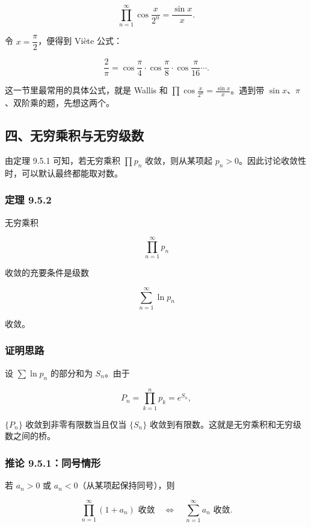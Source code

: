 \[
      \prod_{n=1}^{\infty}\cos\frac{x}{2^n}=\frac{\sin x}{x}.
    \]

令 \(x=\dfrac{\pi}{2}\)，便得到 Viète 公式：

\[
      \frac{2}{\pi}
      =
      \cos\frac{\pi}{4}\cdot\cos\frac{\pi}{8}\cdot\cos\frac{\pi}{16}\cdots.
    \]

\begin{notebox}
这一节里最常用的具体公式，就是 Wallis 和 \(\prod \cos \frac{x}{2^n}=\frac{\sin x}{x}\)。遇到带 \(\sin x\)、\(\pi\)、双阶乘的题，先想这两个。
\end{notebox}

\subsection*{四、无穷乘积与无穷级数}

由定理 9.5.1 可知，若无穷乘积 \(\prod p_n\) 收敛，则从某项起 \(p_n>0\)。因此讨论收敛性时，可以默认最终都能取对数。

\subsubsection*{定理 9.5.2}

无穷乘积

\[
      \prod_{n=1}^{\infty}p_n
    \]

收敛的充要条件是级数

\[
      \sum_{n=1}^{\infty}\ln p_n
    \]

收敛。

\subsubsection*{证明思路}

设 \(\sum\ln p_n\) 的部分和为 \(S_n\)。由于

\[
      P_n=\prod_{k=1}^{n}p_k=e^{S_n},
    \]

\(\{P_n\}\) 收敛到非零有限数当且仅当 \(\{S_n\}\) 收敛到有限数。这就是无穷乘积和无穷级数之间的桥。

\subsubsection*{推论 9.5.1：同号情形}

若 \(a_n>0\) 或 \(a_n<0\)（从某项起保持同号），则

\[
      \prod_{n=1}^{\infty}(1+a_n)\text{ 收敛}
      \quad\Longleftrightarrow\quad
      \sum_{n=1}^{\infty}a_n\text{ 收敛}.
    \]

